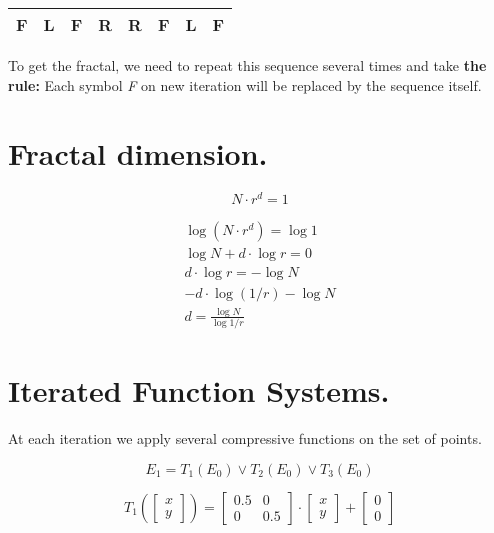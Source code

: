 \documentclass{article}
\begin{document}
\begin{center}
  \begin{tabular}{|c|c|c|c|c|c|c|c|}
    \hline
    F & L & F & R & R & F & L & F \\
    \hline
  \end{tabular} 
\end{center}

To get the fractal, we need to repeat this sequence several times and take \textbf{the rule:}
Each symbol \textit{F} on new iteration will be replaced by the sequence itself.

\section*{Fractal dimension.}

\begin{equation}
  N \cdot r^d = 1
\end{equation}

\begin{equation}
  \begin{aligned}
    \log{(N \cdot r^d)} = \log{1} \\ 
    \log{N} + d \cdot \log{r} = 0 \\ 
    d \cdot \log{r} = -\log{N} \\
    -d \cdot \log{(1/r)}  -\log{N} \\ 
    d = \frac{\log{N}}{\log{1/r}}
  \end{aligned}
\end{equation}

\section*{Iterated Function Systems.}

At each iteration we apply several compressive functions on the set of points.

\begin{equation}
  E_1 = T_1(E_0)\lor T_2(E_0) \lor T_3(E_0)
\end{equation}

\begin{equation}
  T_1(\begin{bmatrix}
    x\\y
  \end{bmatrix}) = \begin{bmatrix}
  0.5&0\\0&0.5
  \end{bmatrix}\cdot\begin{bmatrix}
   x\\y 
  \end{bmatrix}
  +
  \begin{bmatrix}
    0 \\ 0
  \end{bmatrix}
\end{equation}
\end{document}
